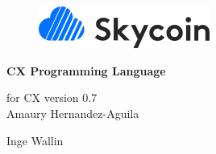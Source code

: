 \documentclass[11pt,fleqn,openany]{book} %
\begin{document}
\raggedbottom


\begingroup
\thispagestyle{empty}
\centering

\vspace*{2.5cm}

\begin{figure}[h]
    \centering
    \includegraphics[width=0.5\textwidth]{img/skycoin-logo.png}
\end{figure}

\vspace*{2.5cm}
\par\normalfont\fontsize{35}{35}\sffamily\selectfont
\textbf{CX Programming Language}\\
\par\normalfont\fontsize{20}{20}\sffamily\selectfont
\vspace*{0.5cm}
{for CX version 0.7}\\

\vspace*{1cm}
{\Huge Amaury Hernandez-Aguila}\par %
{\Huge Inge Wallin}\par %

\endgroup


\newpage
~\vfill
\thispagestyle{empty}



\end{document}
